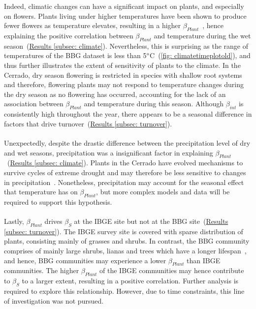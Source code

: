\documentclass[11pt]{article}
\begin{document}
Indeed, climatic changes can have a significant impact on plants, and especially on flowers. Plants living under higher temperatures have been shown to produce fewer flowers as temperature elevates, resulting in a higher $\beta_{Plant}$~\citep{Scaven2013}, hence explaining the positive correlation between $\beta_{Plant}$ and temperature during the wet season~(\hyperref[subsec: climate]{Results \ref{subsec: climate}}). Nevertheless, this is surprising as the range of temperatures of the BBG dataset is less than 5$\degree$C~(\autoref{fig: climatetimeplotold}), and thus further illustrates the extent of sensitivity of plants to the climate. In the Cerrado, dry season flowering is restricted in species with shallow root systems~\citep{Oliveira2002, Gottsberger2006} and therefore, flowering plants may not respond to temperature changes during the dry season as no flowering has occurred, accounting for the lack of an association between $\beta_{Plant}$ and temperature during this season. Although $\beta_{int}$ is consistently high throughout the year, there appears to be a seasonal difference in factors that drive turnover~(\hyperref[subsec: turnover]{Results \ref{subsec: turnover}}).\\
\\
Unexpectedly, despite the drastic difference between the precipitation level of dry and wet seasons, precipitation was a insignificant factor in explaining $\beta_{Plant}$~(\hyperref[subsec: climate]{Results \ref{subsec: climate}}). Plants in the Cerrado have evolved mechanisms to survive cycles of extreme drought and may therefore be less sensitive to changes in precipitation~\citep{Oliveira2002, Gottsberger2006}. Nonetheless, precipitation may account for the seasonal effect that temperature has on $\beta_{Plant}$, but more complex models and data will be required to support this hypothesis. \\
\\
Lastly, $\beta_{Plant}$ drives $\beta_{S}$ at the IBGE site but not at the BBG site~(\hyperref[subsec: turnover]{Results \ref{subsec: turnover}}). The IBGE survey site is covered with sparse distribution of plants, consisting mainly of grasses and shrubs. In contrast, the BBG community comprises of mainly large shrubs, lianas and trees which have a longer lifespan~\citep{Eiten1972}, and hence, BBG communities may experience a lower $\beta_{Plant}$ than IBGE communities. The higher $\beta_{Plant}$ of the IBGE communities may hence contribute to $\beta_{S}$ to a larger extent, resulting in a positive correlation. Further analysis is required to explore this relationship. However, due to time constraints, this line of investigation was not pursued. 
\end{document}
